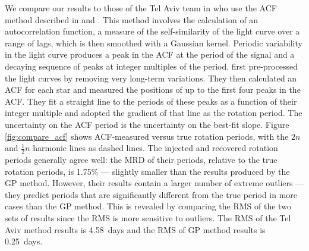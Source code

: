 \documentclass[a4paper,fleqn,usenatbib,useAMS]{mnras}
\newcommand{\response}[1]{{#1}}
\newcommand{\ie}{{\it i.e.}}
\newcommand{\gpRMS}{0.25}
\newcommand{\telavivRMS}{4.58}
\newcommand{\percenttelavivMAD}{1.75}
\begin{document}
We compare our results to those of the Tel Aviv team in \citet{Aigrain2015}
who use the ACF method described in \citet{Mcquillan2014} and
\citet{Aigrain2015}.
\response{This method involves the calculation of an autocorrelation function, a
measure of the self-similarity of the light curve over a range of lags, which
is then smoothed with a Gaussian kernel.
Periodic variability in the light curve produces a peak in the ACF at the
period of the signal and a decaying sequence of peaks at integer multiples of
the period.
\citet{Mcquillan2014} first pre-processed the light curves by removing very
long-term variations.
They then calculated an ACF for each star and measured the positions of up to
the first four peaks in the ACF.
They fit a straight line to the periods of these peaks as a function of their
integer multiple and adopted the gradient of that line as the rotation
period.
The uncertainty on the ACF period is the uncertainty on the best-fit slope.
}
Figure \ref{fig:compare_acf} shows ACF-measured versus true rotation
periods, with the $2n$ and $\frac{1}{2}n$ harmonic lines as dashed lines.
The injected and recovered rotation periods generally agree well: the MRD of
their periods, relative to the true rotation periods, is \percenttelavivMAD\%
--- slightly smaller than the results produced by the GP method.
However, their results contain a larger number of extreme outliers --- they
predict periods that are significantly different from the true period in more
cases than the GP method.
This is revealed by comparing the RMS of the two sets of results since the RMS
is more sensitive to outliers.
The RMS of the Tel Aviv method results is \telavivRMS\ days and the RMS of GP
method results is \gpRMS\ days.

\end{document}
